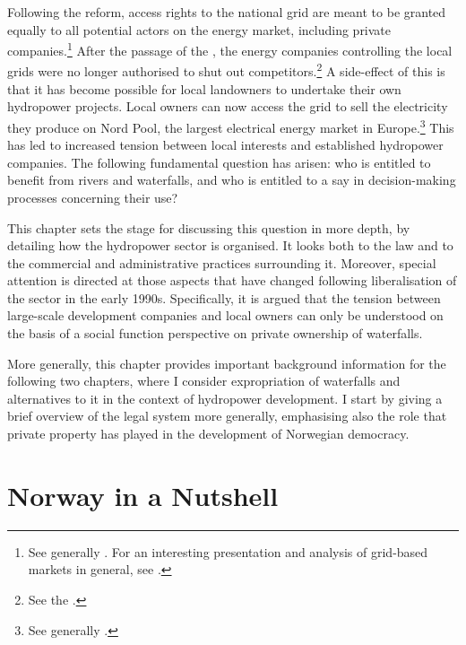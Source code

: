 Following the reform, access rights to the national grid are meant to be granted equally to all potential actors on the energy market, including private companies.\footnote{See generally \cite{hammer96}. For an interesting presentation and analysis of grid-based markets in general, see \cite{falch04}.} After the passage of the \cite{ea90}, the energy companies controlling the local grids were no longer authorised to shut out competitors.\footnote{See the \cite[3-4]{ea90}.} A side-effect of this is that it has become possible for local landowners to undertake their own hydropower projects. Local owners can now access the grid to sell the electricity they produce on Nord Pool, the largest electrical energy market in Europe.\footnote{See generally \cite{larsen06,larsen08,larsen12}.} This has led to increased tension between local interests and established hydropower companies. The following fundamental question has arisen: who is entitled to benefit from rivers and waterfalls, and who is entitled to a say in decision-making processes concerning their use?

This chapter sets the stage for discussing this question in more depth, by detailing how the hydropower sector is organised. It looks both to the law and to the commercial and administrative practices surrounding it. Moreover, special attention is directed at those aspects that have changed following liberalisation of the sector in the early 1990s. Specifically, it is argued that the tension between large-scale development companies and local owners can only be understood on the basis of a social function perspective on private ownership of waterfalls. 

More generally, this chapter provides important background information for the following two chapters, where I consider expropriation of waterfalls and alternatives to it in the context of hydropower development. I start by giving a brief overview of the legal system more generally, emphasising also the role that private property has played in the development of Norwegian democracy.

\section{Norway in a Nutshell}\label{sec:4:2}

